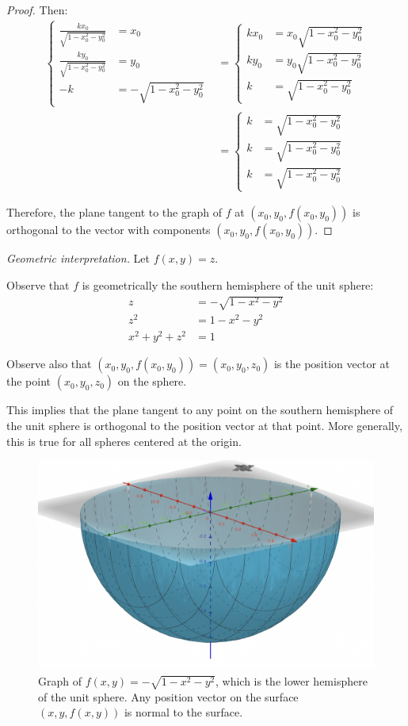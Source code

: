 \begin{proof}
    Then:
    \begin{align*}
        \begin{cases}
            \frac{kx_0}{\sqrt{1 - x_0^2 - y_0^2}} &= x_0 \\
            \frac{ky_0}{\sqrt{1 - x_0^2 - y_0^2}} &= y_0 \\
            -k &= -\sqrt{1 - x_0^2 - y_0^2}
        \end{cases} 
        &= 
        \begin{cases}
            kx_0 &= x_0 \sqrt{1 - x_0^2 - y_0^2} \\
            ky_0 &= y_0 \sqrt{1 - x_0^2 - y_0^2} \\
            k &= \sqrt{1 - x_0^2 - y_0^2}
        \end{cases} \\
        &= 
        \begin{cases}
            k &= \sqrt{1 - x_0^2 - y_0^2} \\
            k &= \sqrt{1 - x_0^2 - y_0^2} \\
            k &= \sqrt{1 - x_0^2 - y_0^2}
        \end{cases}
    \end{align*}
    
    Therefore, the plane tangent to the graph of \(f\) at \((x_0, y_0, f(x_0, y_0))\) is orthogonal to the vector with components \((x_0, y_0, f(x_0, y_0))\).
\end{proof}

\textit{Geometric interpretation.} Let \(f(x, y) = z\).

Observe that \(f\) is geometrically the southern hemisphere of the unit sphere:
\begin{align*}
    z &= -\sqrt{1 - x^2 - y^2} \\
    z^2 &= 1 - x^2 - y^2 \\
    x^2 + y^2 + z^2 &= 1
\end{align*}

Observe also that \((x_0, y_0, f(x_0, y_0)) = (x_0, y_0, z_0)\) is the position vector at the point \((x_0, y_0, z_0)\) on the sphere.

This implies that the plane tangent to any point on the southern hemisphere of the unit sphere is orthogonal to the position vector at that point. More generally, this is true for all spheres centered at the origin.

\begin{figure}[h!]
    \centering
    \includegraphics[width=15cm]{Pictures/Tutorial 1-1.png}
    \caption{Graph of \(f(x, y) = -\sqrt{1 - x^2 - y^2}\), which is the lower hemisphere of the unit sphere. Any position vector on the surface \((x,y,f(x,y))\) is normal to the surface.}
\end{figure}